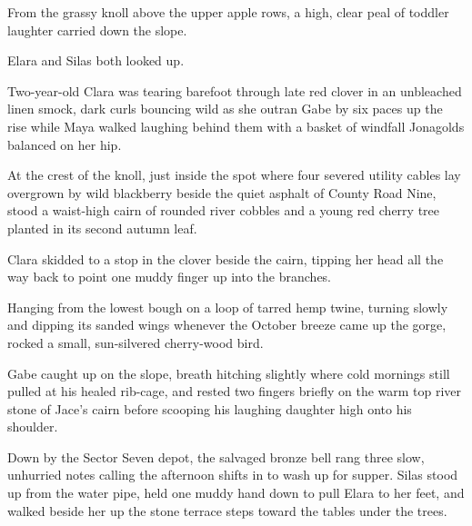 From the grassy knoll above the upper apple rows, a high, clear peal of toddler laughter carried down the slope.

Elara and Silas both looked up.

Two-year-old Clara was tearing barefoot through late red clover in an unbleached linen smock, dark curls bouncing wild as she outran Gabe by six paces up the rise while Maya walked laughing behind them with a basket of windfall Jonagolds balanced on her hip.

At the crest of the knoll, just inside the spot where four severed utility cables lay overgrown by wild blackberry beside the quiet asphalt of County Road Nine, stood a waist-high cairn of rounded river cobbles and a young red cherry tree planted in its second autumn leaf.

Clara skidded to a stop in the clover beside the cairn, tipping her head all the way back to point one muddy finger up into the branches.

Hanging from the lowest bough on a loop of tarred hemp twine, turning slowly and dipping its sanded wings whenever the October breeze came up the gorge, rocked a small, sun-silvered cherry-wood bird.

Gabe caught up on the slope, breath hitching slightly where cold mornings still pulled at his healed rib-cage, and rested two fingers briefly on the warm top river stone of Jace's cairn before scooping his laughing daughter high onto his shoulder.

Down by the Sector Seven depot, the salvaged bronze bell rang three slow, unhurried notes calling the afternoon shifts in to wash up for supper. Silas stood up from the water pipe, held one muddy hand down to pull Elara to her feet, and walked beside her up the stone terrace steps toward the tables under the trees.
